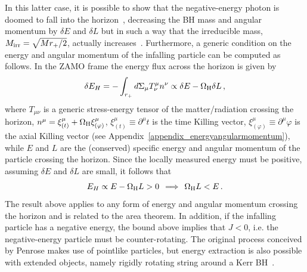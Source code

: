 \documentclass[11pt]{article}
\newcommand{\be}{\begin{equation}}
\newcommand{\ee}{\end{equation}}
\numberwithin{equation}{section} %
\begin{document}
In this latter case, it is possible to show that the negative-energy photon is doomed to fall into the horizon~\cite{Contopoulos1984}, decreasing the BH mass and angular momentum by $\delta E$ and $\delta L$ but in such a way that the irreducible mass, $M_{\rm irr}=\sqrt{Mr_+/2}$, actually increases~\cite{Chandra}. Furthermore, a generic condition on the energy and angular momentum of the infalling particle can be computed as follows. In the ZAMO frame the energy flux across the horizon is given by 
%
\be\label{energy_hole_zamo}
\delta E_{H}= -\int_{r_+} d\Sigma_\mu T^{\mu}_{\nu}n^{\nu} \propto \delta E-\Omega_{\rm H} \delta L\,,
\ee
%
where $T_{\mu\nu}$ is a generic stress-energy tensor of the matter/radiation crossing the horizon, $n^{\mu}=\xi^{\mu}_{(t)}+\Omega_{\rm H}\xi^{\mu}_{(\varphi)}$, $\xi^{\mu}_{(t)}\equiv \partial^{\mu}t$ is the time Killing vector, $\xi^{\mu}_{(\varphi)}\equiv \partial^{\mu}\varphi$ is the axial Killing vector (see Appendix~\ref{appendix_energyangularmomentum}),  while $E$ and $L$ are the (conserved) specific energy and angular momentum of the particle crossing the horizon. Since the locally measured energy must be positive,  assuming $\delta E$ and $\delta L$ are small, it follows that  
%
\be\label{penrose_condition}
E_{H}\propto E-\Omega_{\rm H} L>0\, \implies \, \Omega_{\rm H} L<E\,.
\ee 
%
The result above applies to any form of energy and angular momentum crossing the horizon and is related to the area theorem. In addition, if the infalling particle has a negative energy, the bound above implies that $J<0$, i.e. the negative-energy particle must be counter-rotating. The original process conceived by Penrose makes use of pointlike particles, but energy extraction is also possible with extended objects, namely rigidly rotating string around a Kerr BH~\cite{Kinoshita:2016lqd}.
\end{document}
